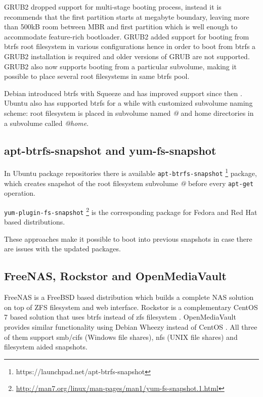 \documentclass[a4paper,11pt]{kth-mag}
\begin{document}
GRUB2 dropped support for multi-stage booting process,
instead it is recommends that the first partition
starts at megabyte boundary, leaving
more than 500kB room between MBR
and first partition which is well enough to accommodate
feature-rich bootloader.
GRUB2 added support for booting from \acrshort{btrfs} root filesystem
in various configurations
hence in order to boot from
\acrshort{btrfs} a GRUB2 installation is required and older versions of
GRUB are not supported.
GRUB2 also now supports booting from a particular subvolume,
making it possible to place several root filesystems
in same \acrshort{btrfs} pool.
\cite{does-grub-support-btrfs}

Debian introduced \acrshort{btrfs} with Squeeze and has improved support
since then \cite{debian-btrfs}.
Ubuntu also has supported \acrshort{btrfs} for a while with customized
subvolume naming scheme:
root filesystem is placed in subvolume named \emph{@}
and home directories in a subvolume called \emph{@home}.

\subsection{apt-btrfs-snapshot and yum-fs-snapshot}

In Ubuntu package repositories there is available
\lstinline!apt-btrfs-snapshot!
\footnote{https://launchpad.net/apt-btrfs-snapshot}
package,
which creates snapshot of the root filesystem subvolume \emph{@}
before every \lstinline!apt-get! operation.

\lstinline!yum-plugin-fs-snapshot!
\footnote{\url{http://man7.org/linux/man-pages/man1/yum-fs-snapshot.1.html}}
is the corresponding package for Fedora and
Red Hat based distributions.


These approaches make it possible to boot into previous snapshots
in case there are issues with the updated packages.

\subsection{FreeNAS, Rockstor and OpenMediaVault}

FreeNAS is a FreeBSD \cite{freenas}
based distribution which builds a complete NAS solution on top of
ZFS filesystem and web interface.
Rockstor is a complementary CentOS 7 based solution that uses \acrshort{btrfs} instead
of \acrshort{zfs} filesystem \cite{rockstor}.
OpenMediaVault provides similar functionality using Debian Wheezy
instead of CentOS \cite{openmediavault}.
All three of them support \acrshort{smb}/\acrshort{cifs} (Windows file shares),
\acrshort{nfs} (UNIX file shares) and filesystem aided snapshots.
\end{document}
